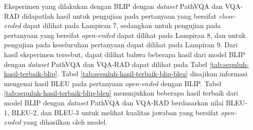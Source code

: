 \par Eksperimen yang dilakukan dengan BLIP dengan \textit{dataset} PathVQA dan VQA-RAD didapatlah hasil untuk pengujian pada pertanyaan yang bersifat \textit{close-ended} dapat dilihat pada Lampiran 7, sedangkan untuk pengujian pada pertanyaan yang bersifat \textit{open-ended} dapat dilihat pada Lampiran 8, dan untuk pengujian pada keseluruhan pertanyaan dapat dilihat pada Lampiran 9. Dari hasil eksperimen tersebut, dapat dilihat bahwa beberapa hasil dari model BLIP dengan \textit{dataset} PathVQA dan VQA-RAD dapat dilihat pada Tabel \ref{tab:sepuluh-hasil-terbaik-blip}. Tabel \ref{tab:sepuluh-hasil-terbaik-blip-bleu} disajikan informasi mengenai hasil BLEU pada pertanyaan \textit{open-ended} dengan BLIP. Tabel \ref{tab:sepuluh-hasil-terbaik-blip-bleu} menunjukkan beberapa hasil terbaik dari model BLIP dengan \textit{dataset} PathVQA dan VQA-RAD berdasarkan nilai BLEU-1, BLEU-2, dan BLEU-3 untuk melihat kualitas jawaban yang bersifat \textit{open-ended} yang dihasilkan oleh model.

